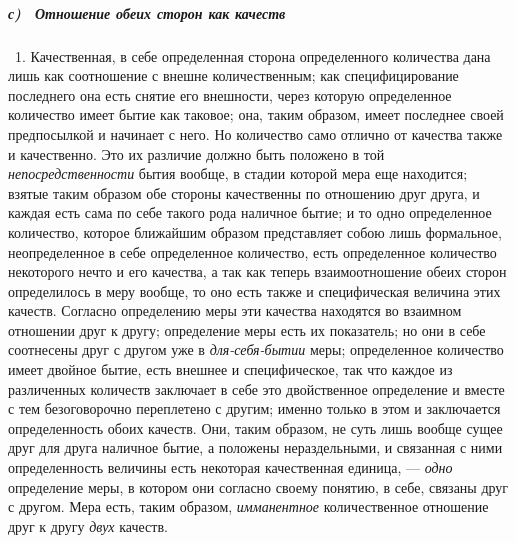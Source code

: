 \subparagraph[с) \ Отношение обеих сторон как качеств]{с) \ Отношение обеих
сторон как качеств}
\hypertarget{Toc478978677}{}\ 1. Качественная, в себе определенная сторона
определенного количества дана лишь как соотношение с внешне количественным;
как специфицирование последнего она есть снятие его внешности, через
которую определенное количество имеет бытие как таковое; она, таким
образом, имеет последнее своей предпосылкой и начинает с него. Но
количество само отлично от качества также и качественно. Это их различие
должно быть положено в той {\em непосредственности}
бытия вообще, в стадии которой мера еще находится; взятые таким образом обе
стороны качественны по отношению друг друга, и каждая есть сама по себе
такого рода наличное бытие; и то одно определенное количество, которое
ближайшим образом представляет собою лишь формальное, неопределенное в себе
определенное количество, есть определенное количество некоторого нечто и
его качества, а так как теперь взаимоотношение обеих сторон определилось в
меру вообще, то оно есть также и специфическая величина этих качеств.
Согласно определению меры эти качества находятся во взаимном отношении друг
к другу; определение меры есть их показатель; но они в себе соотнесены друг
с другом уже в {\em для-себя-бытии} меры; определенное
количество имеет двойное бытие, есть внешнее и специфическое, так что
каждое из различенных количеств заключает в себе это двойственное
определение и вместе с тем безоговорочно переплетено с другим; именно
только в этом и заключается определенность обоих качеств. Они, таким
образом, не суть лишь вообще сущее друг для друга наличное бытие, а
положены нераздельными, и связанная с ними определенность величины есть
некоторая качественная единица, — {\em одно}
определение меры, в котором они согласно своему понятию, в себе, связаны
друг с другом. Мера есть, таким образом,
{\em имманентное} количественное отношение друг к другу
{\em двух} качеств.

